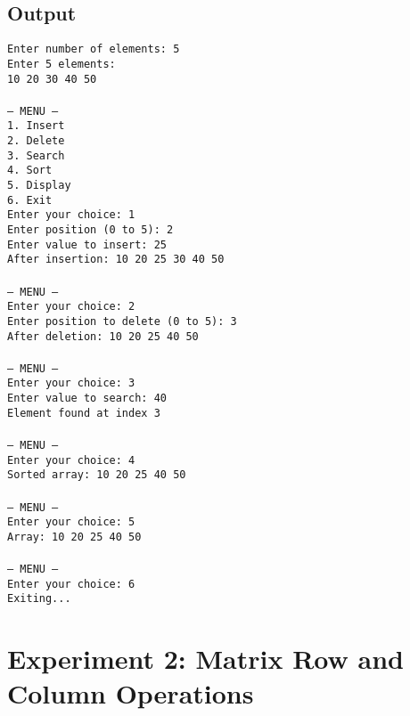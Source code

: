 \documentclass[12pt,a4paper]{article}
\begin{document}
\subsection*{Output}
\begin{tcolorbox}[terminalstyle, title=Sample Output]
\texttt{Enter number of elements: 5 \\
Enter 5 elements: \\
10 20 30 40 50 \\
\\
--- MENU --- \\
1. Insert\\2. Delete\\3. Search\\4. Sort\\5. Display\\6. Exit\\
Enter your choice: 1\\
Enter position (0 to 5): 2\\
Enter value to insert: 25\\
After insertion: 10 20 25 30 40 50 \\
\\
--- MENU --- \\
Enter your choice: 2\\
Enter position to delete (0 to 5): 3\\
After deletion: 10 20 25 40 50 \\
\\
--- MENU --- \\
Enter your choice: 3\\
Enter value to search: 40\\
Element found at index 3 \\
\\
--- MENU --- \\
Enter your choice: 4\\
Sorted array: 10 20 25 40 50 \\
\\
--- MENU --- \\
Enter your choice: 5\\
Array: 10 20 25 40 50 \\
\\
--- MENU --- \\
Enter your choice: 6\\
Exiting...}
\end{tcolorbox}

\newpage
\section*{Experiment 2: Matrix Row and Column Operations}
\end{document}
